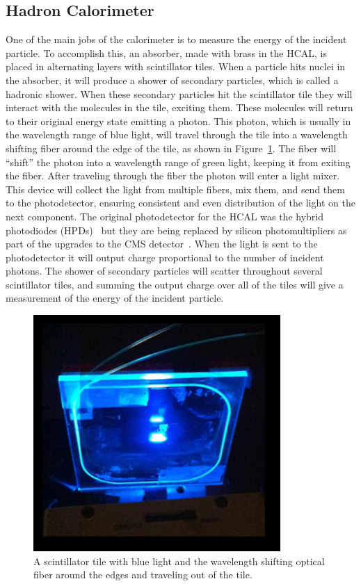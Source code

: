 \subsection{Hadron Calorimeter} \label{HCAL}
One of the main jobs of the calorimeter is to measure the energy of the incident particle. To accomplish this, an absorber, made with brass in the HCAL, is placed in alternating layers with scintillator tiles. When a particle hits nuclei in the absorber, it will produce a shower of secondary particles, which is called a hadronic shower. When these secondary particles hit the scintillator tile they will interact with the molecules in the tile, exciting them. These molecules will return to their original energy state emitting a photon. This photon, which is usually in the wavelength range of blue light, will travel through the tile into a wavelength shifting fiber around the edge of the tile, as shown in Figure~\ref{fig:Tile}. The fiber will ``shift'' the photon into a wavelength range of green light, keeping it from exiting the fiber. After traveling through the fiber the photon will enter a light mixer. This device will collect the light from multiple fibers, mix them, and send them to the photodetector, ensuring consistent and even distribution of the light on the next component. The original photodetector for the HCAL was the hybrid photodiodes (HPDs)~\cite{HPD} but they are being replaced by silicon photomultipliers as part of the upgrades to the CMS detector~\cite{HCALPhase1}. When the light is sent to the photodetector it will output charge proportional to the number of incident photons. The shower of secondary particles will scatter throughout several scintillator tiles, and summing the output charge over all of the tiles will give a measurement of the energy of the incident particle. 
\begin{figure}
\centering
\includegraphics[width=0.6\linewidth]{Figures/Tile.png}
\caption{A scintillator tile with blue light and the wavelength shifting optical fiber around the edges and traveling out of the tile.}
\label{fig:Tile}
\end{figure}


